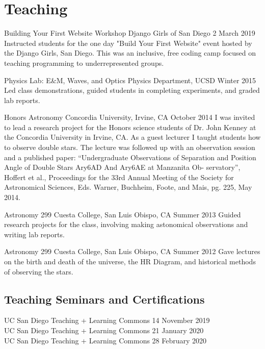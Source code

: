 \section{Teaching}

    {Building Your First Website Workshop}
    {Django Girls of San Diego}
    {2 March 2019}
Instructed students for the one day "Build Your First Website" event hosted by the Django Girls, San Diego.
This was an inclusive, free coding camp focused on teaching programming to underrepresented groups.

    {Physics Lab: E\&M, Waves, and Optics}
    {Physics Department, UCSD}
    {Winter 2015} 
Led class demonstrations, guided students in completing experiments, and graded lab reports.

    {Honors Astronomy}
    {Concordia University, Irvine, CA}
    {October 2014}
I was invited to lead a research project for the Honors science students of Dr. John Kenney at the Concordia University in Irvine, CA. As a guest lecturer I taught students how to observe double stars. The lecture was followed up with an observation session and a published paper:
``Undergraduate Observations of Separation and Position Angle of Double Stars Ary6AD And Ary6AE at Manzanita Ob- servatory'', Hoffert et al., Proceedings for the 33rd Annual Meeting of the Society for Astronomical Sciences, Eds. Warner, Buchheim, Foote, and Mais, pg. 225, May 2014.

    {Astronomy 299}
    {Cuesta College, San Luis Obispo, CA}
    {Summer 2013}
Guided research projects for the class, involving making astonomical observations and writing lab reports.

    {Astronomy 299}
    {Cuesta College, San Luis Obispo, CA}
    {Summer 2012}
Gave lectures on the birth and death of the universe, the HR Diagram, and historical methods of observing the stars.

\subsection{Teaching Seminars and Certifications}
    {UC San Diego Teaching + Learning Commons}
    {14 November 2019}\\
    {UC San Diego Teaching + Learning Commons}
    {21 January 2020}\\
    {UC San Diego Teaching + Learning Commons}
    {28 February 2020}
